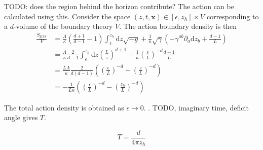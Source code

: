 \documentclass[12pt]{report}
\renewcommand{\d}{\ensuremath{\mathrm{d}}}
\begin{document}
TODO: does the region behind the horizon contribute?
The action can be calculated using this. Consider the space $(z,t,\mathbf{x})\in[\epsilon,z_h]\times V$ corresponding to a $d$-volume of the boundary theory $V$. The action boundary density is then
\begin{equation}
\begin{split}
 \frac{S_{\mathrm{grav}}}{V}&=\frac{\Lambda}{\kappa}\left(\frac{d+1}{d-1}-1\right)\int_\epsilon^{z_h}\d z\sqrt{-g}+
\frac{1}{\kappa}\sqrt{\gamma}\left(-\gamma^{ab}\partial_a\d z_b+\frac{d-1}{L}\right)\\
&=\frac{\Lambda}{\kappa}\frac{2}{d-1}\int_\epsilon^{z_h}\d z\left(\frac{L}{z}\right)^{d+1}+
\frac{1}{\kappa}\left(\frac{\epsilon}{L}\right)^{-d}\frac{d-1}{L}\\
&=\frac{L\Lambda}{\kappa}\frac{2}{d(d-1)}\left(\left(\frac{\epsilon}{L}\right)^{-d}-\left(\frac{z}{L}\right)^{-d}\right)\\
&=-\frac{1}{L\kappa}\left(\left(\frac{\epsilon}{L}\right)^{-d}-\left(\frac{z_h}{L}\right)^{-d}\right)
\end{split}
\end{equation}

The total action density is obtained as $\epsilon\rightarrow0$.
.  TODO, imaginary time, deficit angle gives $T$.


\begin{equation}
 T=\frac{d}{4\pi  z_h}\label{T}
\end{equation}
\end{document}
